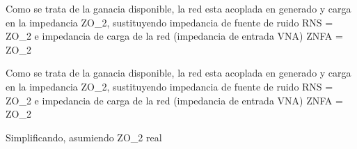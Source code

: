 \documentclass{article}
\begin{document}
\begin{maplegroup}
\mapleresult
\begin{maplelatex}
\end{maplelatex}
\end{maplegroup}
\begin{Maple Normal}{
\begin{Maple Normal}{
Como se trata de la ganacia disponible, la red esta acoplada en generado y carga en la impedancia ZO\_2, sustituyendo impedancia de fuente de ruido RNS = ZO\_2 e impedancia de carga de la red (impedancia de entrada VNA) ZNFA = ZO\_2}\end{Maple Normal}

\begin{Maple Normal}{
Como se trata de la ganacia disponible, la red esta acoplada en generado y carga en la impedancia ZO\_2, sustituyendo impedancia de fuente de ruido RNS = ZO\_2 e impedancia de carga de la red (impedancia de entrada VNA) ZNFA = ZO\_2}\end{Maple Normal}

}\end{Maple Normal}

\begin{maplegroup}
\mapleresult
\begin{maplelatex}
\end{maplelatex}
\end{maplegroup}
\begin{Maple Normal}{
\begin{Maple Normal}{
Simplificando, asumiendo ZO\_2 real}\end{Maple Normal}

}\end{Maple Normal}
\end{document}
